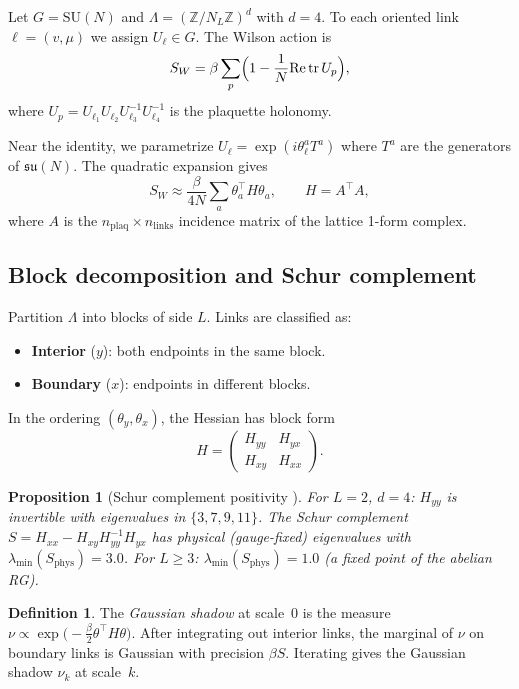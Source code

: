 \documentclass[11pt]{article}
\newtheorem{proposition}[theorem]{Proposition}
\theoremstyle{definition}
\newtheorem{definition}[theorem]{Definition}
\newcommand{\tr}{\mathrm{tr}}
\newcommand{\su}{\mathfrak{su}}
\newcommand{\Z}{\mathbb{Z}}
\begin{document}
Let $G = \mathrm{SU}(N)$ and $\Lambda = (\Z/N_L\Z)^d$ with $d = 4$.  
To each oriented link $\ell = (v, \mu)$ we assign $U_\ell \in G$.  
The Wilson action is
\[
  S_W = \beta \sum_{p} \Bigl(1 - \frac{1}{N} \mathrm{Re}\,\tr\, U_p\Bigr),
\]
where $U_p = U_{\ell_1} U_{\ell_2} U_{\ell_3}^{-1} U_{\ell_4}^{-1}$ 
is the plaquette holonomy.

Near the identity, we parametrize $U_\ell = \exp(i \theta_\ell^a T^a)$ 
where $T^a$ are the generators of $\su(N)$.  The quadratic expansion 
gives
\[
  S_W \approx \frac{\beta}{4N} \sum_a \theta_a^\top H \theta_a, \qquad 
  H = A^\top A,
\]
where $A$ is the $n_{\mathrm{plaq}} \times n_{\mathrm{links}}$ incidence 
matrix of the lattice 1-form complex.

\subsection{Block decomposition and Schur complement}

Partition $\Lambda$ into blocks of side $L$.  Links are classified as:
\begin{itemize}
\item \textbf{Interior} ($y$): both endpoints in the same block.
\item \textbf{Boundary} ($x$): endpoints in different blocks.
\end{itemize}

In the ordering $(\theta_y, \theta_x)$, the Hessian has block form
\[
  H = \begin{pmatrix} H_{yy} & H_{yx} \\ H_{xy} & H_{xx} \end{pmatrix}.
\]

\begin{proposition}[Schur complement positivity {\cite[Thm.~4.1]{Fontes_antisym}}]
\label{prop:schur}
For $L = 2$, $d = 4$: $H_{yy}$ is invertible with eigenvalues in 
$\{3, 7, 9, 11\}$.  The Schur complement 
$S = H_{xx} - H_{xy} H_{yy}^{-1} H_{yx}$ 
has physical (gauge-fixed) eigenvalues with $\lambda_{\min}(S_{\mathrm{phys}}) = 3.0$.
For $L \geq 3$: $\lambda_{\min}(S_{\mathrm{phys}}) = 1.0$ 
(a fixed point of the abelian RG).
\end{proposition}

\begin{definition}
The \emph{Gaussian shadow} at scale~0 is the measure 
$\nu \propto \exp\bigl(-\frac{\beta}{2} \theta^\top H \theta\bigr)$.
After integrating out interior links, the marginal of $\nu$ on 
boundary links is Gaussian with precision $\beta S$.  
Iterating gives the Gaussian shadow $\nu_k$ at scale~$k$.
\end{definition}
\end{document}
